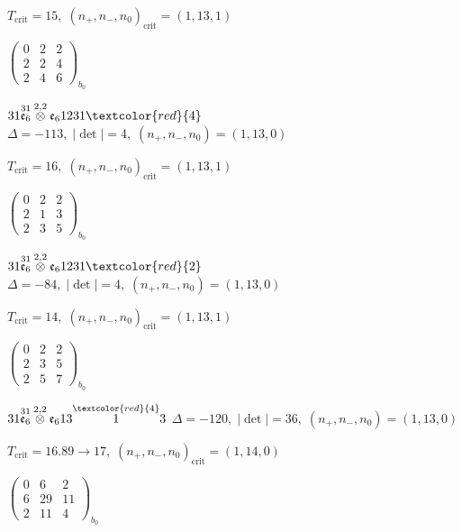 \documentclass[10pt]{article}
\begin{document}
\hspace{1em}$T_{\text{crit}}=15,\; (n_+,n_-,n_0)_{\text{crit}}=(1,13,1)$

\hspace{2em}$\left(\begin{smallmatrix}0 & 2 & 2 \\ 2 & 2 & 4 \\ 2 & 4 & 6\end{smallmatrix}\right)_{\!b_0}$

$31\overset{31}{\mathfrak{e}_6}\overset{2,2}{\otimes}\mathfrak{e}_61231\textcolor{red}{4}$ \quad $\Delta=-113,\; |\det|=4,\; (n_+,n_-,n_0)=(1,13,0)$

\hspace{1em}$T_{\text{crit}}=16,\; (n_+,n_-,n_0)_{\text{crit}}=(1,13,1)$

\hspace{2em}$\left(\begin{smallmatrix}0 & 2 & 2 \\ 2 & 1 & 3 \\ 2 & 3 & 5\end{smallmatrix}\right)_{\!b_0}$

$31\overset{31}{\mathfrak{e}_6}\overset{2,2}{\otimes}\mathfrak{e}_61231\textcolor{red}{2}$ \quad $\Delta=-84,\; |\det|=4,\; (n_+,n_-,n_0)=(1,13,0)$

\hspace{1em}$T_{\text{crit}}=14,\; (n_+,n_-,n_0)_{\text{crit}}=(1,13,1)$

\hspace{2em}$\left(\begin{smallmatrix}0 & 2 & 2 \\ 2 & 3 & 5 \\ 2 & 5 & 7\end{smallmatrix}\right)_{\!b_0}$

\smallskip

$31\overset{31}{\mathfrak{e}_6}\overset{2,2}{\otimes}\mathfrak{e}_613\overset{\textcolor{red}{4}}{1}3$ \quad $\Delta=-120,\; |\det|=36,\; (n_+,n_-,n_0)=(1,13,0)$

\hspace{1em}$T_{\text{crit}}=16.89 \to 17,\; (n_+,n_-,n_0)_{\text{crit}}=(1,14,0)$

\hspace{2em}$\left(\begin{smallmatrix}0 & 6 & 2 \\ 6 & 29 & 11 \\ 2 & 11 & 4\end{smallmatrix}\right)_{\!b_0}$
\end{document}
